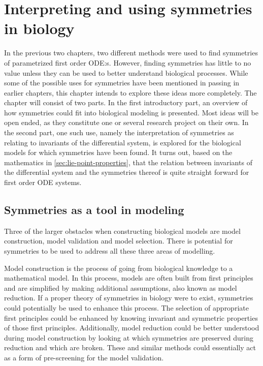\chapter{Interpreting and using symmetries in biology} \label{ch:uses}

In the previous two chapters, two different methods were used to find symmetries of parametrized first order ODE:s.
However, finding symmetries has little to no value unless they can be used to better understand biological processes.
While some of the possible uses for symmetries have been mentioned in passing in earlier chapters, this chapter intends to explore these ideas more completely.
The chapter will consist of two parts.
In the first introductory part, an overview of how symmetries could fit into biological modeling is presented.
Most ideas will be open ended, as they constitute one or several research project on their own.
In the second part, one such use, namely the interpretation of symmetries as relating to invariants of the differential system, is explored for the biological models for which symmetries have been found.
It turns out, based on the mathematics in \cref{sec:lie-point-properties}, that the relation between invariants of the differential system and the symmetries thereof is quite straight forward for first order ODE systems.

\section{Symmetries as a tool in modeling} \label{sec:symmetries-as-tool}

Three of the larger obstacles when constructing biological models are model construction, model validation and model selection.
There is potential for symmetries to be used to address all these three areas of modelling.

Model construction is the process of going from biological knowledge to a mathematical model.
In this process, models are often built from first principles and are simplified by making additional assumptions, also known as model reduction.
If a proper theory of symmetries in biology were to exist, symmetries could potentially be used to enhance this process.
The selection of appropriate first principles could be enhanced by knowing invariant and symmetric properties of those first principles.
Additionally, model reduction could be better understood during model construction by looking at which symmetries are preserved during reduction and which are broken.
These and similar methods could essentially act as a form of pre-screening for the model validation.

